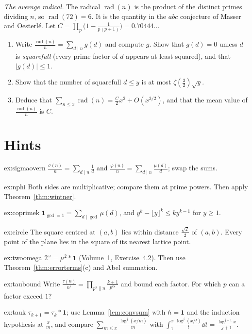 \begin{exercise}[$\star\star$]\label{pb:radical}
\emph{The average radical.} The radical $\operatorname{rad}(n)$ is the product of the distinct primes dividing $n$, so $\operatorname{rad}(72)=6$. It is the quantity in
the $abc$ conjecture of Masser and Oesterl\'e. Let $C=\prod_p\bigl(1-\frac1{p(p+1)}\bigr)=0.70444\ldots$
\begin{enumerate}[label=(\alph*)]
\item Write $\frac{\operatorname{rad}(n)}n=\sum_{d\mid n}g(d)$ and compute $g$. Show that $g(d)=0$ unless $d$ is \emph{squarefull} (every prime factor of $d$ appears at
least squared), and that $|g(d)|\le1$.
\item Show that the number of squarefull $d\le y$ is at most $\zeta(\frac32)\sqrt y$.
\item Deduce that $\sum_{n\le x}\operatorname{rad}(n)=\frac C2x^2+O(x^{3/2})$, and that the mean value of $\frac{\operatorname{rad}(n)}n$ is $C$.
\end{enumerate}
\end{exercise}

\section{Hints}

\begin{hint}{ex:sigmaovern}
$\frac{\sigma(n)}n=\sum_{d\mid n}\frac1d$ and $\frac{\varphi(n)}n=\sum_{d\mid n}\frac{\mu(d)}d$; swap the sums.
\end{hint}
\begin{hint}{ex:nphi}
Both sides are multiplicative; compare them at prime powers. Then apply Theorem~\ref{thm:wintner}.
\end{hint}
\begin{hint}{ex:coprimek}
$\mathbf 1_{\gcd=1}=\sum_{d\mid\gcd}\mu(d)$, and $y^k-\lfloor y\rfloor^k\le ky^{k-1}$ for $y\ge1$.
\end{hint}
\begin{hint}{ex:circle}
The square centred at $(a,b)$ lies within distance $\frac{\sqrt2}2$ of $(a,b)$. Every point of the plane lies in the square of its
nearest lattice point.
\end{hint}
\begin{hint}{ex:twoomega}
$2^{\omega}=\mu^2*\mathbf1$ (Volume~1, Exercise~4.2). Then use Theorem~\ref{thm:errorterms}(c) and Abel summation.
\end{hint}
\begin{hint}{ex:taubound}
Write $\frac{\tau(n)}{n^\varepsilon}=\prod_{p^k\|n}\frac{k+1}{p^{k\varepsilon}}$ and bound each factor. For which $p$ can a factor exceed $1$?
\end{hint}
\begin{hint}{ex:tauk}
$\tau_{k+1}=\tau_k*\mathbf1$; use Lemma~\ref{lem:convsum} with $h=\mathbf1$ and the induction hypothesis at $\frac xm$, and compare
$\sum_{m\le x}\frac{\log^{j}(x/m)}m$ with $\int_1^x\frac{\log^j(x/t)}t\dd t=\frac{\log^{j+1}x}{j+1}$.
\end{hint}


